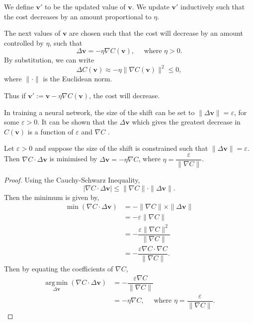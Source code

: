 We define $\mathbf{v}'$ to be the updated value of $\mathbf{v}$. We update $\mathbf{v}'$ inductively such that the cost decreases by an amount proportional to $\eta$.

The next values of $\mathbf{v}$ are chosen such that the cost will decrease by an amount controlled by $\eta$, such that
\[
	\Delta\mathbf{v} = -\eta \nabla C(\mathbf{v}), \quad \text{ where }\eta > 0.
\]
By substitution, we can write
\[
	\Delta C(\mathbf{v}) \approx -\eta \|\nabla C(\mathbf{v})\|^2 \le 0,
\]
where $\|\cdot\|$ is the Euclidean norm.

Thus if $\mathbf{v}' := \mathbf{v} - \eta \nabla C(\mathbf{v})$, the cost will decrease.

In training a neural network, the size of the shift can be set to $\|\Delta\mathbf{v}\| = \varepsilon$, for some $\varepsilon > 0$. It can be shown that the $\Delta\mathbf{v}$ which gives the greatest decrease in $C(\mathbf{v})$ is a function of $\varepsilon$ and $\nabla C$ \cite{Nielson2015}.

\begin{proposition}\label{nnets-graddescminproof}
	Let $\varepsilon > 0$ and suppose the size of the shift is constrained such that $\|\Delta\mathbf{v}\| = \varepsilon$. Then $\nabla C \cdot \Delta\mathbf{v}$ is minimised by $\Delta\mathbf{v} = -\eta\nabla C$, where $\eta = \dfrac{\varepsilon}{\|\nabla C\|}$.
\end{proposition}

\begin{proof}
	Using the Cauchy-Schwarz Inequality,
	\[
			|\nabla C\cdot\Delta\mathbf{v}| \le \|\nabla C\|\cdot\|\Delta\mathbf{v}\|.
	\]
	Then the minimum is given by, \begin{align*}
		\min(\nabla C\cdot\Delta\mathbf{v}) & = -\|\nabla C\|\times\|\Delta\mathbf{v}\| \\
		& = -\varepsilon\|\nabla C\| \\
		& = -\dfrac{\varepsilon\|\nabla C\|^2}{\|\nabla C\|} \\
		& = -\dfrac{\varepsilon\nabla C\cdot\nabla C}{\|\nabla C\|}.
	\end{align*}
	Then by equating the coefficients of $\nabla C$,
	\begin{align*}
		\operatorname*{arg\,min}_{\Delta\mathbf{v}}(\nabla C\cdot\Delta\mathbf{v}) & = -\dfrac{\varepsilon\nabla C}{\|\nabla C\|} \\
		& = -\eta\nabla C,\quad\text{ where }\eta = \dfrac{\varepsilon}{\|\nabla C\|}.
	\end{align*}
\end{proof}

